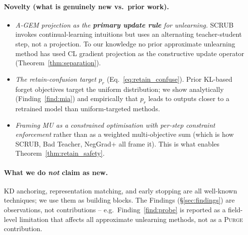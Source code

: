 \documentclass{article}
\newcommand{\ours}{\textsc{Purge}}
\begin{document}
{\paragraph{Novelty (what is genuinely new vs.\ prior work).}
\begin{itemize}[nosep,leftmargin=*]
\item \emph{A-GEM projection as the \textbf{primary update rule} for unlearning.} SCRUB~\cite{kurmanji2023unbounded} invokes continual-learning intuitions but uses an alternating teacher-student step, not a projection. To our knowledge no prior approximate unlearning method has used CL gradient projection as the constructive update operator (Theorem~\ref{thm:separation}).
\item \emph{The retain-confusion target $p_r$} (Eq.~\ref{eq:retain_confuse}). Prior KL-based forget objectives target the uniform distribution; we show analytically (Finding~\ref{find:mia}) and empirically that $p_r$ leads to outputs closer to a retrained model than uniform-targeted methods.
\item \emph{Framing MU as a constrained optimisation with per-step constraint enforcement} rather than as a weighted multi-objective sum (which is how SCRUB, Bad Teacher, NegGrad+ all frame it). This is what enables Theorem~\ref{thm:retain_safety}.
\end{itemize}

\paragraph{What we do \emph{not} claim as new.}
KD anchoring, representation matching, and early stopping are all well-known techniques; we use them as building blocks. The Findings (\S\ref{sec:findings}) are observations, not contributions -- e.g.\ Finding~\ref{find:probe} is reported as a field-level limitation that affects all approximate unlearning methods, not as a \ours{} contribution.

}
\end{document}
